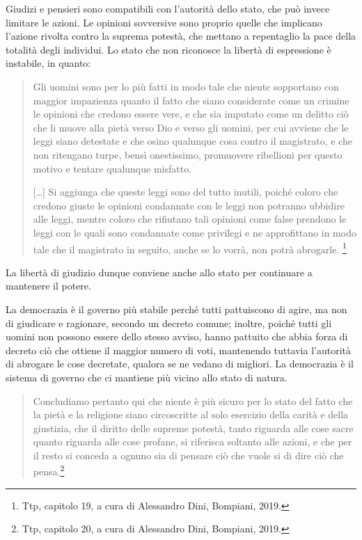 Giudizi e pensieri sono compatibili con l'autorità dello stato, che può invece limitare le azioni. Le opinioni sovversive sono proprio quelle che implicano l'azione rivolta contro la suprema potestà, che mettano a repentaglio la pace della totalità degli individui. Lo stato che non riconosce la libertà di espressione è instabile, in quanto:

\begin{quotation}
	\small Gli uomini sono per lo più fatti in modo tale che niente sopportano con maggior impazienza quanto il fatto che siano considerate come un crimine le opinioni che credono essere vere, e che sia imputato come un delitto ciò che li muove alla pietà verso Dio e verso gli uomini, per cui avviene che le leggi siano detestate e che osino qualunque cosa contro il magistrato, e che non ritengano turpe, bensì onestissimo, promuovere ribellioni per questo motivo e tentare qualunque misfatto.
	
	[\dots] Si aggiunga che queste leggi sono del tutto inutili, poiché coloro che credono giuste le opinioni condannate con le leggi non potranno ubbidire alle leggi, mentre coloro che rifiutano tali opinioni come false prendono le leggi con le quali sono condannate come privilegi e ne approfittano in modo tale che il magistrato in seguito, anche se lo vorrà, non potrà abrogarle.
	\footnote{Ttp, capitolo 19, a cura di Alessandro Dini, Bompiani, 2019.}
\end{quotation}

La libertà di giudizio dunque conviene anche allo stato per continuare a mantenere il potere.

La democrazia è il governo più stabile perché tutti pattuiscono di agire, ma non di giudicare e ragionare, secondo un decreto comune; inoltre,  poiché tutti gli uomini non possono essere dello stesso avviso, hanno pattuito che abbia forza di decreto ciò che  ottiene il maggior numero di voti, mantenendo tuttavia l'autorità di abrogare le cose decretate, qualora se ne vedano di migliori. La democrazia è il sistema di governo che ci mantiene più vicino allo stato di natura.

\begin{quotation}
	\small Concludiamo pertanto qui che niente è più sicuro per lo stato del fatto che la pietà e la religione siano circoscritte al solo esercizio della carità  e della giustizia, che il diritto delle supreme potestà, tanto riguarda alle cose sacre quanto riguarda alle cose profane, si riferisca soltanto alle azioni, e che per il resto si conceda a ognuno sia di pensare ciò che vuole si di dire ciò che pensa.\footnote{Ttp, capitolo 20, a cura di Alessandro Dini, Bompiani, 2019.}
\end{quotation}

\newpage